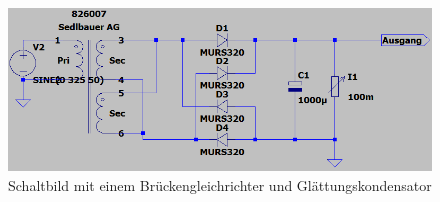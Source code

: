        \begin{figure}[ht!]
            \centering
            \includegraphics[width=.9\textwidth]{Bilder/gleichrichter.PNG}
            \caption{Schaltbild mit einem Brückengleichrichter und Glättungskondensator}
            \label{fig:gleichrichter}
        \end{figure}